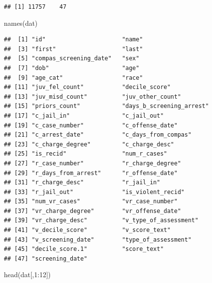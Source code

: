 \documentclass[
]{article}
\newenvironment{Shaded}{\begin{snugshade}}{\end{snugshade}}
\newcommand{\DecValTok}[1]{\textcolor[rgb]{0.00,0.00,0.81}{#1}}
\newcommand{\FunctionTok}[1]{\textcolor[rgb]{0.00,0.00,0.00}{#1}}
\newcommand{\NormalTok}[1]{#1}
\newcommand{\SpecialCharTok}[1]{\textcolor[rgb]{0.00,0.00,0.00}{#1}}
\begin{document}
\begin{verbatim}
## [1] 11757    47
\end{verbatim}

\begin{Shaded}
\begin{Highlighting}[]
\FunctionTok{names}\NormalTok{(dat)}
\end{Highlighting}
\end{Shaded}

\begin{verbatim}
##  [1] "id"                      "name"                   
##  [3] "first"                   "last"                   
##  [5] "compas_screening_date"   "sex"                    
##  [7] "dob"                     "age"                    
##  [9] "age_cat"                 "race"                   
## [11] "juv_fel_count"           "decile_score"           
## [13] "juv_misd_count"          "juv_other_count"        
## [15] "priors_count"            "days_b_screening_arrest"
## [17] "c_jail_in"               "c_jail_out"             
## [19] "c_case_number"           "c_offense_date"         
## [21] "c_arrest_date"           "c_days_from_compas"     
## [23] "c_charge_degree"         "c_charge_desc"          
## [25] "is_recid"                "num_r_cases"            
## [27] "r_case_number"           "r_charge_degree"        
## [29] "r_days_from_arrest"      "r_offense_date"         
## [31] "r_charge_desc"           "r_jail_in"              
## [33] "r_jail_out"              "is_violent_recid"       
## [35] "num_vr_cases"            "vr_case_number"         
## [37] "vr_charge_degree"        "vr_offense_date"        
## [39] "vr_charge_desc"          "v_type_of_assessment"   
## [41] "v_decile_score"          "v_score_text"           
## [43] "v_screening_date"        "type_of_assessment"     
## [45] "decile_score.1"          "score_text"             
## [47] "screening_date"
\end{verbatim}

\begin{Shaded}
\begin{Highlighting}[]
\FunctionTok{head}\NormalTok{(dat[,}\DecValTok{1}\SpecialCharTok{:}\DecValTok{12}\NormalTok{])}
\end{Highlighting}
\end{Shaded}
\end{document}
